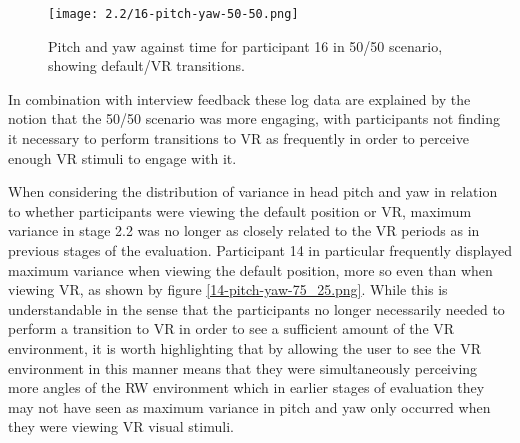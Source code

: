 \begin{figure}[h]
	\begin{center}
	\texttt{[image: 2.2/16-pitch-yaw-50-50.png]}
	\caption{Pitch and yaw against time for participant 16 in 50/50 scenario, showing default/VR transitions.}
	\label{16-pitch-yaw-50-50.png}
	\end{center}
\end{figure}

In combination with interview feedback these log data are explained by the notion that the 50/50 scenario was more engaging, with participants not finding it necessary to perform transitions to VR as frequently in order to perceive enough VR stimuli to engage with it.

\newpage

When considering the distribution of variance in head pitch and yaw in relation to whether participants were viewing the default position or VR, maximum variance in stage 2.2 was no longer as closely related to the VR periods as in previous stages of the evaluation. Participant 14 in particular frequently displayed maximum variance when viewing the default position, more so even than when viewing VR, as shown by figure \ref{14-pitch-yaw-75_25.png}. While this is understandable in the sense that the participants no longer necessarily needed to perform a transition to VR in order to see a sufficient amount of the VR environment, it is worth highlighting that by allowing the user to see the VR environment in this manner means that they were simultaneously perceiving more angles of the RW environment which in earlier stages of evaluation they may not have seen as maximum variance in pitch and yaw only occurred when they were viewing VR visual stimuli.

\vspace{1.5cm}

